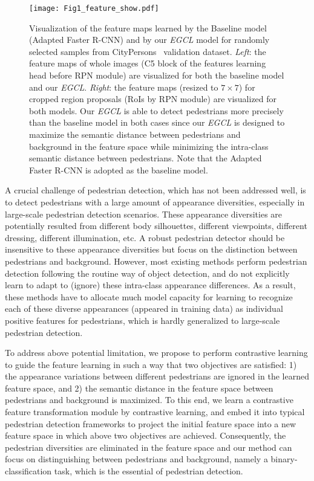 \documentclass[journal]{IEEEtran}
\begin{document}
\begin{figure*}[t]
\centering
    \texttt{[image: Fig1\_feature\_show.pdf]}
\caption{
    Visualization of the feature maps learned by the Baseline model (Adapted Faster R-CNN) and by our \emph{EGCL} model for randomly selected samples from CityPersons~\cite{zhang2017citypersons} validation dataset. \emph{Left}: the feature maps of whole images (C5 block of the features learning head before RPN module) are visualized for both the baseline model and our \emph{EGCL}. \emph{Right}: the feature maps (resized to $7\times 7$) for cropped region proposals (RoIs by RPN module) are visualized for both models. Our \emph{EGCL} is able to detect pedestrians more precisely than the baseline model in both cases since our \emph{EGCL} is designed to maximize the semantic distance between pedestrians and background in the feature space while minimizing the intra-class semantic distance between pedestrians. Note that the Adapted Faster R-CNN is adopted as the baseline model.
}
\label{Fig:intro}
\end{figure*}




A crucial challenge of pedestrian detection, which has not been addressed well, is to detect pedestrians with a large amount of appearance diversities, especially in large-scale pedestrian detection scenarios. These appearance diversities are potentially resulted from different body silhouettes, different viewpoints, different dressing, different illumination, etc. A robust pedestrian detector should be insensitive to these appearance diversities but focus on the distinction between pedestrians and background. However, most existing methods perform pedestrian detection following the routine way of object detection, and do not explicitly learn to adapt to (ignore) these intra-class appearance differences. As a result, these methods have to allocate much model capacity for learning to recognize each of these diverse appearances (appeared in training data) as individual positive features for pedestrians, which is hardly generalized to large-scale pedestrian detection.

To address above potential limitation, we propose to perform contrastive learning to guide the feature learning in such a way that two objectives are satisfied: 1) the appearance variations between different pedestrians are ignored in the learned feature space, and 2) the semantic distance in the feature space between pedestrians and background is maximized. To this end, we learn a contrastive feature transformation module by contrastive learning, and embed it into typical pedestrian detection frameworks to project the initial feature space into a new feature space in which above two objectives are achieved. Consequently, the pedestrian diversities are eliminated in the feature space and our method can focus on distinguishing between pedestrians and background, namely a binary-classification task, which is the essential of pedestrian detection.
\end{document}
